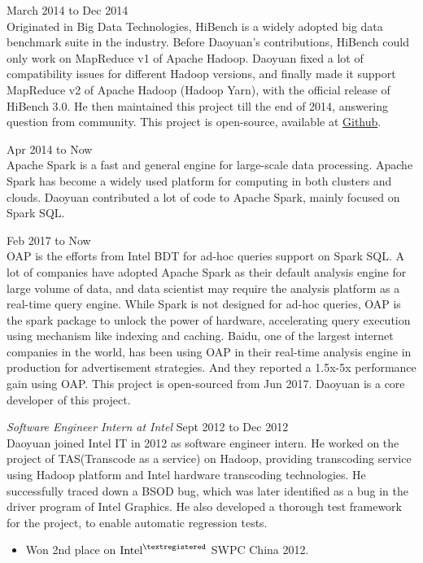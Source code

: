 \documentclass[line,margin]{res}
\begin{document}
\begin{resume}
\begin{outline}
              \hfill        March 2014 to Dec 2014\\
                Originated in Big Data Technologies, HiBench is a widely adopted big data benchmark suite in the industry. Before Daoyuan's contributions, HiBench could only work on MapReduce v1 of Apache Hadoop. Daoyuan fixed a lot of compatibility issues for different Hadoop versions, and finally made it support MapReduce v2 of Apache Hadoop (Hadoop Yarn), with the official release of HiBench 3.0. He then maintained this project till the end of 2014, answering question from community. This project is open-source, available at \href{https://github.com/intel-hadoop/HiBench}{Github}.
                   
             \hfill        Apr 2014 to Now\\
                Apache Spark is a fast and general engine for large-scale data processing. Apache Spark has become a widely used platform for computing in both clusters and clouds. Daoyuan contributed a lot of code to Apache Spark, mainly focused on Spark SQL.
                   
              \hfill        Feb 2017 to Now\\
                OAP is the efforts from Intel BDT for ad-hoc queries support on Spark SQL. A lot of companies have adopted Apache Spark as their default analysis engine for large volume of data, and data scientist may require the analysis platform as a real-time query engine. While Spark is not designed for ad-hoc queries, OAP is the spark package to unlock the power of hardware, accelerating query execution using mechanism like indexing and caching.
                Baidu, one of the largest internet companies in the world, has been using OAP in their real-time analysis engine in production for advertisement strategies. And they reported a 1.5x-5x performance gain using OAP.
                This project is open-sourced from Jun 2017. Daoyuan is a core developer of this project.
        \end{outline}

      {\sl Software Engineer Intern at Intel} \hfill         Sept 2012 to Dec 2012\\
             Daoyuan joined Intel IT in 2012 as software engineer intern. He worked on the project of TAS(Transcode as a service) on Hadoop, providing transcoding service using Hadoop platform and Intel hardware transcoding technologies. He successfully traced down a BSOD bug, which was later identified as a bug in the driver program of Intel Graphics. He also developed a thorough test framework for the project, to enable automatic regression tests.
                  \begin{itemize}
                   \item Won 2nd place on $\textrm{Intel}^{\textregistered}$ SWPC China 2012.
                   \end{itemize}


\end{resume}
\end{document}
